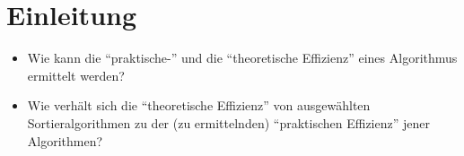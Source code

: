 \chapter*{Einleitung}





\begin{itemize}
    \item Wie kann die \enquote{praktische-} und die \enquote{theoretische Effizienz} eines Algorithmus ermittelt werden?
    \item Wie verhält sich die \enquote{theoretische Effizienz} von ausgewählten Sortieralgorithmen zu der (zu ermittelnden) \enquote{praktischen Effizienz} jener Algorithmen?
\end{itemize}


